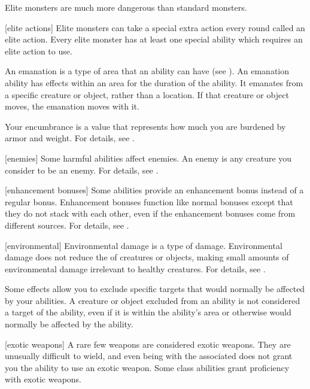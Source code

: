  Elite monsters are much more dangerous than standard monsters.

[elite actions] Elite monsters can take a special extra action every round called an elite action.
Every elite monster has at least one special ability which requires an elite action to use.

 An emanation is a type of area that an ability can have (see ).
An emanation ability has effects within an area for the duration of the ability.
It emanates from a specific creature or object, rather than a location.
If that creature or object moves, the emanation moves with it.

 Your encumbrance is a value that represents how much you are burdened by armor and weight.
For details, see .

[enemies] Some harmful abilities affect enemies.
An enemy is any creature you consider to be an enemy.
For details, see .

[enhancement bonuses] Some abilities provide an enhancement bonus instead of a regular bonus.
Enhancement bonuses function like normal bonuses except that they do not stack with each other, even if the enhancement bonuses come from different sources.
For details, see .

[environmental] Environmental damage is a type of damage.
Environmental damage does not reduce the  of creatures or objects, making small amounts of environmental damage irrelevant to healthy creatures.
For details, see .

 Some effects allow you to exclude specific targets that would normally be affected by your abilities.
A creature or object excluded from an ability is not considered a target of the ability, even if it is within the ability's area or otherwise would normally be affected by the ability.

[exotic weapons] A rare few weapons are considered exotic weapons.
They are unusually difficult to wield, and even being  with the associated  does not grant you the ability to use an exotic weapon.
Some class abilities grant proficiency with exotic weapons.

